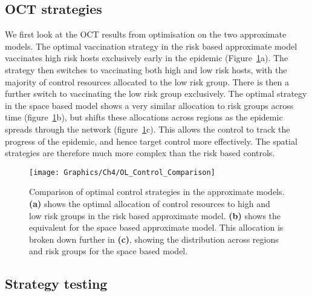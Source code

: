 \subsection{OCT strategies}

We first look at the OCT results from optimisation on the two approximate models. The optimal vaccination strategy in the risk based approximate model vaccinates high risk hosts exclusively early in the epidemic (Figure~\ref{fig:ch4:opt_control_comparison}a). The strategy then switches to vaccinating both high and low risk hosts, with the majority of control resources allocated to the low risk group. There is then a further switch to vaccinating the low risk group exclusively. The optimal strategy in the space based model shows a very similar allocation to risk groups across time (figure~\ref{fig:ch4:opt_control_comparison}b), but shifts these allocations across regions as the epidemic spreads through the network (figure~\ref{fig:ch4:opt_control_comparison}c). This allows the control to track the progress of the epidemic, and hence target control more effectively. The spatial strategies are therefore much more complex than the risk based controls.

\begin{figure}[h]
    \begin{center}
        \texttt{[image: Graphics/Ch4/OL\_Control\_Comparison]}
        \caption{Comparison of optimal control strategies in the approximate models. \textbf{(a)} shows the optimal allocation of control resources to high and low risk groups in the risk based approximate model. \textbf{(b)} shows the equivalent for the space based approximate model. This allocation is broken down further in \textbf{(c)}, showing the distribution across regions and risk groups for the space based model.}
        \label{fig:ch4:opt_control_comparison}
    \end{center}
\end{figure}

\subsection{Strategy testing}


